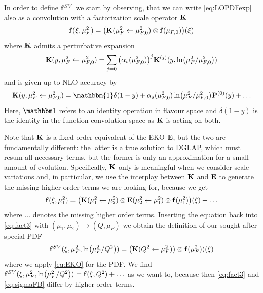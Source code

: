 In order to define $\vb f^{SV}$ we start by observing, that we can write \cref{eq:LOPDFexp} also as a convolution with a factorization scale operator $\vb K$
\begin{equation}
    \vb f(\xi,\mu_F^2) = \qty(\vb K(\mu_F^2 \leftarrow \mu_{F,0}^2) \otimes \vb f(\mu_{F,0}))(\xi)
\end{equation}
where $\vb K$ admits a perturbative expansion
\begin{equation}
    \vb K(y,\mu_F^2 \leftarrow \mu_{F,0}^2) = \sum_{j=0} \qty(\alpha_s(\mu_{F,0}^2))^j \vb K^{(j)}(y,\ln(\mu_F^2/\mu_{F,0}^2))
\end{equation}
and is given up to NLO accuracy by
\begin{equation}
    \vb K(y,\mu_F^2 \leftarrow \mu_{F,0}^2) = \mathbbm{1}\delta(1-y) + \alpha_s(\mu_{F,0}^2) \ln(\mu_F^2/\mu_{F,0}^2) \vb P^{(0)}(y) + \ldots \label{eq:NLOK}
\end{equation}
Here, $\mathbbm 1$ refers to an identity operation in flavour space and $\delta(1-y)$ is the identity in the function convolution space as $\vb K$ is acting on both.

Note that $\vb K$ is a fixed order equivalent of the EKO $\vb E$, but the two are fundamentally different: the latter is a true solution to DGLAP, which must resum all necessary terms, but the former is only an approximation for a small amount of evolution.
Specifically, $\vb K$ only is meaningful when we consider scale variations and, in particular, we use the interplay between $\vb K$ and $\vb E$ to generate the missing higher order terms we are looking for, because we get
\begin{equation}
    \vb f(\xi,\mu_1^2) = \qty(\vb K(\mu_1^2 \leftarrow \mu_2^2) \otimes \vb E(\mu_2^2 \leftarrow \mu_1^2) \otimes \vb f(\mu_1^2) )(\xi) + \ldots
\end{equation}
where $\ldots$ denotes the missing higher order terms.
Inserting the equation back into \cref{eq:fact3} with $(\mu_1,\mu_2)\to(Q,\mu_F)$ we obtain the definition of our sought-after special PDF
\begin{equation}
    \vb f^{SV}(\xi,\mu_F^2,\ln(\mu_F^2/Q^2)) = \qty(\vb K(Q^2 \leftarrow \mu_F^2)) \otimes \vb f(\mu_F^2))(\xi) \label{eq:fSV}
\end{equation}
where we apply \cref{eq:EKO} for the PDF.
We find $\vb f^{SV}(\xi,\mu_F^2,\ln(\mu_F^2/Q^2)) = \vb f(\xi,Q^2) + \ldots$ as we want to, because then \cref{eq:fact3} and \cref{eq:sigmaFB} differ by higher order terms.

